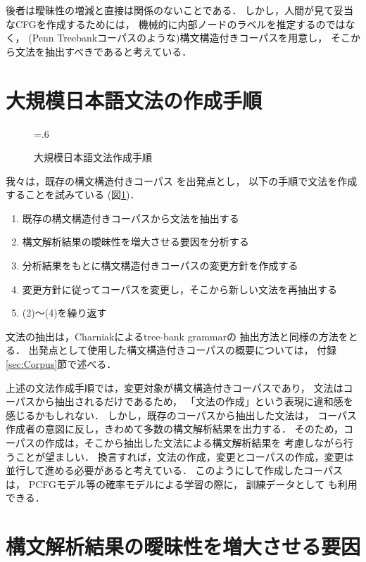 後者は曖昧性の増減と直接は関係のないことである．
しかし，人間が見て妥当なCFGを作成するためには，
機械的に内部ノードのラベルを推定するのではなく，
(Penn Treebankコーパスのような)構文構造付きコーパスを用意し，
そこから文法を抽出すべきであると考えている．


\section{大規模日本語文法の作成手順}
\label{sec:Procedure}

\begin{figure}[tp]
  \centering
  \epsfxsize=.6\textwidth
  \caption{大規模日本語文法作成手順}
  \label{fig:procedure}
\end{figure}

我々は，既存の構文構造付きコーパス
を出発点とし，
以下の手順で文法を作成することを試みている
(図\ref{fig:procedure})．
\begin{enumerate}
\item 既存の構文構造付きコーパスから文法を抽出する
\item 構文解析結果の曖昧性を増大させる要因を分析する
\item 分析結果をもとに構文構造付きコーパスの変更方針を作成する
\item 変更方針に従ってコーパスを変更し，そこから新しい文法を再抽出する
\item (2)〜(4)を繰り返す
\end{enumerate}
文法の抽出は，Charniakによるtree-bank grammarの
抽出方法\cite{charniak:96}と同様の方法をとる．
出発点として使用した構文構造付きコーパスの概要については，
付録\ref{sec:Corpus}節で述べる．

上述の文法作成手順では，変更対象が構文構造付きコーパスであり，
文法はコーパスから抽出されるだけであるため，
「文法の作成」という表現に違和感を感じるかもしれない．
しかし，既存のコーパスから抽出した文法は，
コーパス作成者の意図に反し，きわめて多数の構文解析結果を出力する．
そのため，コーパスの作成は，そこから抽出した文法による構文解析結果を
考慮しながら行うことが望ましい．
換言すれば，文法の作成，変更とコーパスの作成，変更は
並行して進める必要があると考えている．
このようにして作成したコーパスは，
PCFGモデル等の確率モデルによる学習の際に，
訓練データとして
も利用できる．


\section{構文解析結果の曖昧性を増大させる要因}
\label{sec:Problem}

